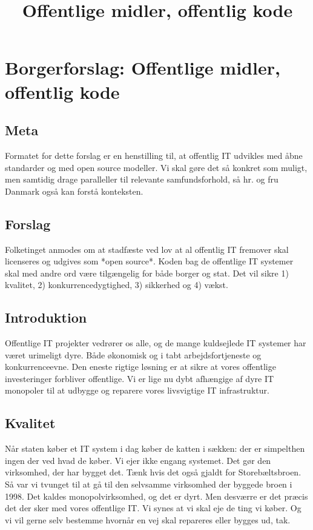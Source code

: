 \documentclass[fleqn]{article}
\title{Offentlige midler, offentlig kode}
\author{}
\begin{document}
\maketitle

\setcounter{secnumdepth}{0}

\section{Borgerforslag: Offentlige midler, offentlig kode}

\subsection{Meta}
Formatet for dette forslag er en henstilling til, at offentlig IT udvikles med åbne
standarder og med open source modeller. Vi skal gøre det så konkret som muligt, men 
samtidig drage paralleller til relevante samfundsforhold, så hr. og fru Danmark også 
kan forstå konteksten.

\subsection{Forslag}
\begin{large}
Folketinget anmodes om at stadfæste ved lov at al offentlig IT fremover skal licenseres
og udgives som *open source*. Koden bag de offentlige IT systemer skal med andre ord
være tilgængelig for både borger og stat. Det vil sikre 1) kvalitet,
2) konkurrencedygtighed, 3) sikkerhed og 4) vækst.
\end{large}

\subsection{Introduktion}
Offentlige IT projekter vedrører os alle, og de mange kuldsejlede IT systemer har
været urimeligt dyre. Både økonomisk og i tabt arbejdsfortjeneste og konkurrenceevne.
Den eneste rigtige løsning er at sikre at vores offentlige investeringer forbliver
offentlige. Vi er lige nu dybt afhængige af dyre IT monopoler til at udbygge og
reparere vores livsvigtige IT infrastruktur.

\subsection{Kvalitet}
Når staten køber et IT system i dag køber de katten i sækken: der er simpelthen ingen
der ved hvad de køber. Vi ejer ikke engang systemet. Det gør den virksomhed, der har bygget
det. Tænk hvis det også gjaldt for Storebæltsbroen. Så var vi tvunget til at gå til den
selvsamme virksomhed der byggede broen i 1998. Det kaldes monopolvirksomhed, og det er dyrt.
Men desværre er det præcis det der sker med vores offentlige IT.
Vi synes at vi skal eje de ting vi køber. Og vi vil gerne selv bestemme hvornår en vej skal
repareres eller bygges ud, tak.
\end{document}
